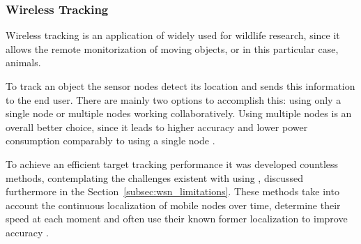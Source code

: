 \subsubsection{Wireless Tracking}
\label{subsubsection:wireless_tracking}
Wireless tracking is an application of  widely used for wildlife research,
since it allows the remote monitorization of moving objects, or in this particular case,
animals.

To track an object the sensor nodes detect its location and sends this information to the end
user. There are mainly two options to accomplish this: using only a single node or multiple
nodes working collaboratively. Using multiple nodes is an overall better choice, since it leads
to higher accuracy and lower power consumption comparably to using a single node \cite{Ez2016}.

To achieve an efficient target tracking performance it was developed countless methods,
contemplating the challenges existent with using , discussed furthermore in
the Section~\ref{subsec:wsn_limitations}. These methods take into account the continuous
localization of mobile nodes over time, determine their speed at each moment and often use
their known former localization to improve accuracy \cite{Kumar2017}.


